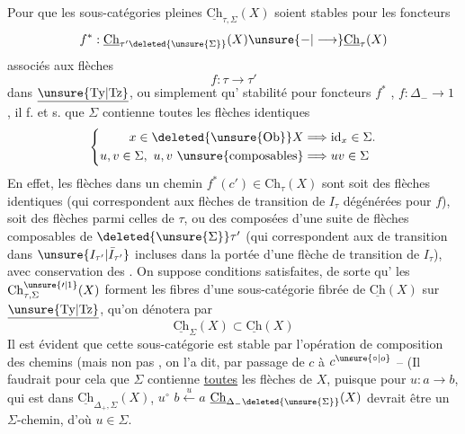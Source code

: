Pour que les sous-catégories pleines $\underline{\mathrm{Ch}}_{\tau,\Sigma}(X)$ soient stables pour les foncteurs 
\[f^*:\underline{\mathrm{Ch}}_{\tau'\deleted{\unsure{\Sigma}}}(X)\unsure{\mathord{-}|\longrightarrow}\underline{\mathrm{Ch}}_\tau(X)\]
associés aux flèches
\[f:\tau\longrightarrow\tau'\]
dans $\underline{\unsure{\mathrm{Ty}|\mathrm{Tz}}}$, ou simplement  qu'  stabilité pour  foncteurs $f^*$  ,  $f:\Delta_-\longrightarrow1$ , il f. et s. que $\Sigma$  contienne toutes les flèches identiques \unsure{:|;}
\[\left\{\begin{aligned}x\in\deleted{\unsure{\mathrm{Ob}}}X&\Longrightarrow\mathrm{id}_x\in\Sigma.\\
u,v\in\Sigma,\ u,v\ \text{\unsure{composables}}&\Longrightarrow uv\in\Sigma\end{aligned}\right.\]
En effet, les flèches dans un chemin $f^*(c')\in\mathrm{Ch}_\tau(X)$ sont soit  des flèches identiques (qui correspondent aux  flèches de transition de $I_\tau$ dégénérées pour $f$), soit des flèches parmi celles de $\tau$, ou des composées d'une suite de flèches  composables de $\deleted{\unsure{\Sigma}}\tau'$ (qui correspondent aux  de transition dans $\unsure{I_{\tau'}|\bar I_{\tau'}}$ incluses dans la portée d'une flèche de transition de $I_\tau$), avec conservation des .
On suppose  conditions satisfaites, de sorte qu'  les $\mathrm{Ch}_{\tau,\Sigma}^{\unsure{\prime|1}}(X)$ forment les fibres d'une sous-catégorie fibrée  de $\underline{\mathrm{Ch}}(X)$ sur $\underline{\unsure{\mathrm{Ty}|\mathrm{Tz}}}$, qu'on dénotera par
\[\underline{\mathrm{Ch}}_\Sigma(X)\subset\underline{\mathrm{Ch}}(X)\]
Il est évident que cette sous-catégorie est stable par l'opération de composition des chemins (mais non pas , on l'a dit, par passage de $c$ à $c^{\unsure{\circ|o}}$ -- (Il faudrait pour cela que $\Sigma$ contienne \uline{toutes} les flèches de $X$, puisque pour  $u:a\longrightarrow b$, qui est  dans $\underline{\mathrm{Ch}}_{\Delta_+,\Sigma}(X)$, $u^\circ$  $b\xleftarrow{u}a$  $\underline{\mathrm{Ch}}_{\Delta_-\deleted{\unsure{\Sigma}}}(X)$ devrait être un $\Sigma$-chemin, d'où $u\in\Sigma$.

